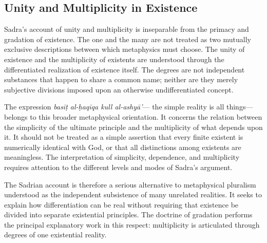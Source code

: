 


\subsection{Unity and Multiplicity in Existence}
\label{subsec:ch08_s17_ss07}

\label{para:VS.B01.P01.C08.S17.SS07.P001}

Sadra's account of unity and multiplicity
is inseparable from the primacy
and gradation of existence. The
one and the many are not treated
as two mutually exclusive descriptions
between which metaphysics must
choose. The unity of existence
and the multiplicity of existents
are understood through the
differentiated realization of
existence itself. The degrees
are not independent substances
that happen to share a common
name; neither are they merely
subjective divisions imposed
upon an otherwise undifferentiated
concept.

\label{para:VS.B01.P01.C08.S17.SS07.P002}

The expression \textit{basīṭ
al-ḥaqīqa kull al-ashyā'}—
the simple reality is all things—
belongs to this broader metaphysical
orientation. It concerns the
relation between the simplicity
of the ultimate principle and
the multiplicity of what depends
upon it. It should not be treated
as a simple assertion that every
finite existent is numerically
identical with God, or that
all distinctions among existents
are meaningless. The interpretation
of simplicity, dependence,
and multiplicity requires
attention to the different
levels and modes of Sadra's
argument.

\label{para:VS.B01.P01.C08.S17.SS07.P003}

The Sadrian account is therefore
a serious alternative to
metaphysical pluralism understood
as the independent subsistence
of many unrelated realities.
It seeks to explain how
differentiation can be real
without requiring that existence
be divided into separate
existential principles. The
doctrine of gradation performs
the principal explanatory work
in this respect: multiplicity
is articulated through degrees
of one existential reality.

